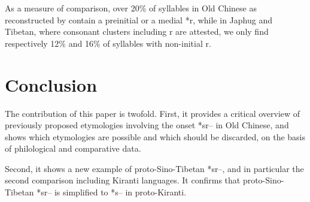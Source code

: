 \documentclass[oldfontcommands,oneside,a4paper,11pt]{article}
\newcommand{\ipa}[1]{{\phon #1}} %
\begin{document}
As a measure of comparison, over 20\% of syllables in Old Chinese as reconstructed by \citet{bs14oc} contain a preinitial or a medial *\ipa{r}, while in Japhug and Tibetan, where consonant clusters including \ipa{r} are attested, we only find respectively 12\% and 16\% of syllables with non-initial \ipa{r}. 

\section{Conclusion}

The contribution of this paper is twofold. First, it provides a critical overview of previously proposed etymologies involving the onset *\ipa{sr--} in Old Chinese, and shows which etymologies are possible and which should be discarded, on the basis of philological and comparative data.

Second, it shows a new example of proto-Sino-Tibetan *\ipa{sr--}, and in particular the second comparison including Kiranti languages. It confirms that proto-Sino-Tibetan *\ipa{sr--} is simplified to *\ipa{s--} in proto-Kiranti.




\end{document}
